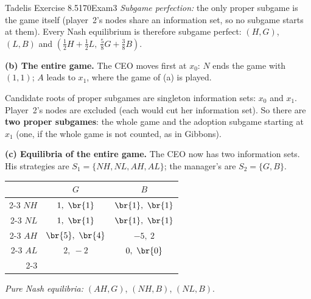 \begin{exsol}{Tadelis Exercise 8.5}{170}{Exam}{3}
\emph{Subgame perfection:} the only proper subgame is the game itself (player~2's nodes share an
information set, so no subgame starts at them). Every Nash equilibrium is therefore subgame
perfect: $(H,G)$, $(L,B)$ and $(\frac12 H + \frac12 L,\ \frac58 G + \frac38 B)$.

\textbf{(b) The entire game.} The CEO moves first at $x_0$: $N$ ends the game with $(1,1)$; $A$
leads to $x_1$, where the game of (a) is played.
\begin{center}
\end{center}
Candidate roots of proper subgames are singleton information sets: $x_0$ and $x_1$. Player~2's
nodes are excluded (each would cut her information set). So there are \textbf{two proper
subgames}: the whole game and the adoption subgame starting at $x_1$ (one, if the whole game is
not counted, as in Gibbons).

\textbf{(c) Equilibria of the entire game.} The CEO now has two information sets. His
strategies are $S_1 = \{NH, NL, AH, AL\}$; the manager's are $S_2 = \{G, B\}$.
\begin{center}
\begin{tabular}{r|c|c|}
\multicolumn{1}{r}{} & \multicolumn{1}{c}{$G$} & \multicolumn{1}{c}{$B$}\\ \cline{2-3}
$NH$ & $1,\ \br{1}$ & $\br{1},\ \br{1}$ \\ \cline{2-3}
$NL$ & $1,\ \br{1}$ & $\br{1},\ \br{1}$ \\ \cline{2-3}
$AH$ & $\br{5},\ \br{4}$ & $-5,\ 2$ \\ \cline{2-3}
$AL$ & $2,\ -2$ & $0,\ \br{0}$ \\ \cline{2-3}
\end{tabular}
\end{center}
\emph{Pure Nash equilibria:} $(AH, G)$, $(NH, B)$, $(NL, B)$.


\end{exsol}
